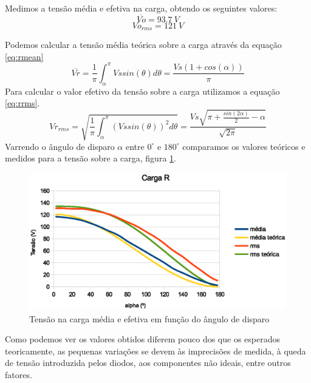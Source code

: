 \documentclass{article}
\begin{document}
Medimos a tensão média e efetiva na carga, obtendo os seguintes valores:
\begin{equation}
\overline{Vo} = 93.7\ V
\end{equation}
\begin{equation}
Vo_{rms} =  121\ V
\end{equation}

Podemos calcular a tensão média teórica sobre a carga através da equação \ref{eq:rmean}
\begin{equation}
	\overline{Vr} = \frac{1}{\pi} \int_{\alpha}^{\pi}{Vs sin(\theta)d\theta} = \frac{Vs (1 + cos(\alpha))}{\pi}
	\label{eq:rmean}
\end{equation}
Para calcular o valor efetivo da tensão sobre a carga utilizamos a equação \ref{eq:rrms}.
\begin{equation}
	Vr_{rms} = \sqrt{\frac{1}{\pi} \int_{\alpha}^{\pi}{(Vs sin(\theta))^2 d\theta}} = \frac{Vs \sqrt{\pi + \frac{sin(2\alpha)}{2}- \alpha }}{\sqrt{2 \pi}} 
	\label{eq:rrms}
\end{equation}
Varrendo o ângulo de disparo $\alpha$ entre $0^\circ$ e $180^\circ$ comparamos os valores teóricos e medidos para a tensão sobre a carga, figura \ref{fig:ralpha}.
\begin{figure}[H]
	\centering
	\includegraphics[width=0.7\linewidth]{dados/R/r_alpha}
	\caption{Tensão na carga média e efetiva em função do ângulo de disparo}
	\label{fig:ralpha}
\end{figure}

Como podemos ver os valores obtidos diferem pouco dos que os esperados teoricamente, as pequenas variações se devem às imprecisões de medida, à queda de tensão introduzida pelos diodos, aos componentes não ideais, entre outros fatores.
\end{document}
